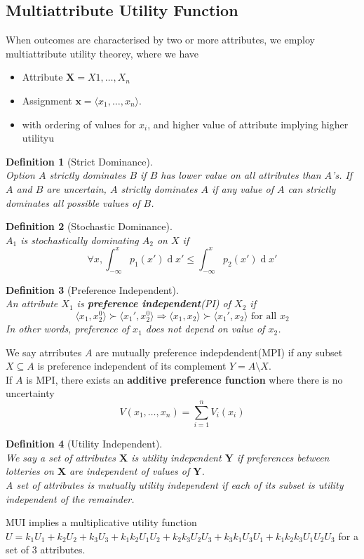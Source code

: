 \documentclass[12pt]{article}
\newtheorem{definition}{Definition}[section]
\theoremstyle{definition}
\DeclareMathOperator{\diff}{d}
\begin{document}
\subsection{Multiattribute Utility Function}
When outcomes are characterised by two or more attributes, we employ multiattribute utility theorey, where we have
\begin{itemize}
	\item Attribute $\bm{X}=X1,\ldots, X_n$
	\item Assignment $\bm{x}=\langle x_1,\ldots, x_n\rangle$.
	\item with ordering of values for $x_i$, and higher value of attribute implying higher utilityu
\end{itemize}
\begin{definition}[Strict Dominance]
\hfill\\\normalfont Option $A$ strictly dominates $B$ if $B$ has lower value on all attributes than $A$'s. If $A$ and $B$ are uncertain, $A$ strictly dominates $A$ if any value of $A$ can strictly dominates all possible values of $B$.
\end{definition}
\begin{definition}[Stochastic Dominance]
\hfill\\\normalfont $A_1$ is stochastically dominating $A_2$ on $X$ if
\[
\forall x, \int_{-\infty}^x p_1(x')\diff x'\leq \int_{-\infty}^xp_2(x')\diff x'
\]
\end{definition}
\begin{definition}[Preference Independent]
\hfill\\\normalfont An attribute $X_1$ is \textbf{preference independent}(PI) of $X_2$ if
\[
\langle x_1,x_2^0\rangle \succ\langle x_1',x_2^0\rangle \Rightarrow \langle x_1,x_2\rangle \succ\langle x_1',x_2\rangle \text{ for all } x_2
\]
In other words, preference of $x_1$ does not depend on value of $x_2$.
\end{definition}
We say atrributes $A$ are mutually preference indepdendent(MPI) if any subset $X\subseteq A$ is preference independent of its complement $Y=A\setminus X$.\\
If $A$ is MPI, there exists an \textbf{additive preference function} where there is no uncertainty
\[
V(x_1,\ldots, x_n)=\sum_{i=1}^n V_i(x_i)
\]
\begin{definition}[Utility Independent]
\hfill\\\normalfont We say a set of attributes $\bm{X}$ is utility independent $\bm{Y}$ if preferences between lotteries on $\bm{X}$ are independent of values of $\bm{Y}$.\\
A set of attributes is mutually utility independent if each of its subset is utility independent of the remainder.
\end{definition}
MUI implies a multiplicative utility function $U=k_1U_1+k_2U_2+k_3U_3+k_1k_2U_1U_2+k_2k_3U_2U_3+k_3k_1U_3U_1+k_1k_2k_3U_1U_2U_3$ for a set of 3 attributes.
\end{document}
